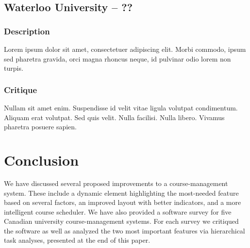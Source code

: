 \documentclass[10pt]{article}
\begin{document}
\begin{multicols}{2}
\subsection*{Waterloo University -- ??}
\subsubsection*{Description}
Lorem ipsum dolor sit amet, consectetuer adipiscing elit. Morbi commodo, ipsum sed pharetra gravida, orci magna rhoncus neque, id pulvinar odio lorem non turpis. 

\subsubsection*{Critique}
Nullam sit amet enim. Suspendisse id velit vitae ligula volutpat condimentum. Aliquam erat volutpat. Sed quis velit. Nulla facilisi. Nulla libero. Vivamus pharetra posuere sapien. 

\section*{Conclusion}
We have discussed several proposed improvements to a course-management system. These include a dynamic element highlighting the most-needed feature based on several factors, an improved layout with better indicators, and a more intelligent course scheduler. We have also provided a software survey for five Canadian university course-management systems. For each survey we critiqued the software as well as analyzed the two most important features via hierarchical task analyses, presented at the end of this paper.

\end{multicols}

\newpage
\end{document}
